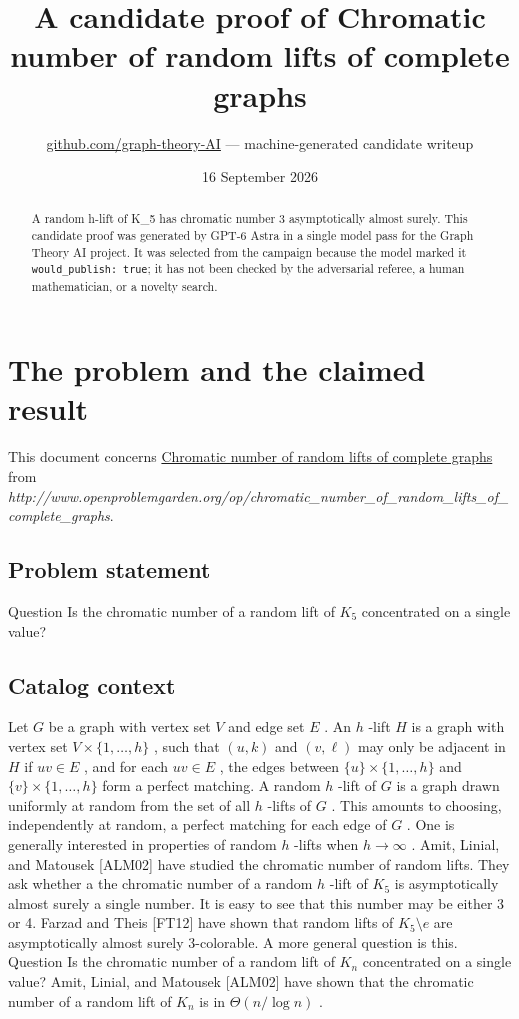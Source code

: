 \documentclass[
  11pt,
  a4paper,
]{article}
\title{A candidate proof of Chromatic number of random lifts of complete
graphs}
\author{\href{https://github.com/graph-theory-AI}{github.com/graph-theory-AI}
--- machine-generated candidate writeup}
\date{16 September 2026}
\begin{document}
\maketitle
\begin{abstract}
A random h-lift of K\_5 has chromatic number 3 asymptotically almost
surely. This candidate proof was generated by GPT-6 Astra in a single
model pass for the Graph Theory AI project. It was selected from the
campaign because the model marked it \texttt{would\_publish:\ true}; it
has not been checked by the adversarial referee, a human mathematician,
or a novelty search.
\end{abstract}

\section{The problem and the claimed
result}\label{the-problem-and-the-claimed-result}

This document concerns
\href{https://graph-theory-ai.github.io/graph-conjectures/op/chromatic_number_of_random_lifts_of_complete_graphs/}{Chromatic
number of random lifts of complete graphs} from
\emph{http://www.openproblemgarden.org/op/chromatic\_number\_of\_random\_lifts\_of\_complete\_graphs}.

\subsection{Problem statement}\label{problem-statement}

Question Is the chromatic number of a random lift of \(K_5\)
concentrated on a single value?

\subsection{Catalog context}\label{catalog-context}

Let \(G\) be a graph with vertex set \(V\) and edge set \(E\) . An \(h\)
-lift \(H\) is a graph with vertex set \(V\times\{1,\dots,h\}\) , such
that \((u,k)\) and \((v,\ell)\) may only be adjacent in \(H\) if
\(uv \in E\) , and for each \(uv\in E\) , the edges between
\(\{u\}\times\{1,\dots,h\}\) and \(\{v\}\times\{1,\dots,h\}\) form a
perfect matching. A random \(h\) -lift of \(G\) is a graph drawn
uniformly at random from the set of all \(h\) -lifts of \(G\) . This
amounts to choosing, independently at random, a perfect matching for
each edge of \(G\) . One is generally interested in properties of random
\(h\) -lifts when \(h\to\infty\) . Amit, Linial, and Matousek
{[}ALM02{]} have studied the chromatic number of random lifts. They ask
whether a the chromatic number of a random \(h\) -lift of \(K_5\) is
asymptotically almost surely a single number. It is easy to see that
this number may be either 3 or 4. Farzad and Theis {[}FT12{]} have shown
that random lifts of \(K_5\setminus e\) are asymptotically almost surely
3-colorable. A more general question is this. Question Is the chromatic
number of a random lift of \(K_n\) concentrated on a single value? Amit,
Linial, and Matousek {[}ALM02{]} have shown that the chromatic number of
a random lift of \(K_n\) is in \(\Theta(n/\log n)\) .
\end{document}

